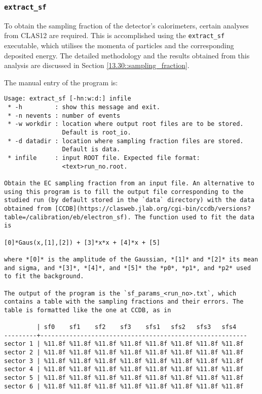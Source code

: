 \subsubsection{\texttt{extract\_sf}}
\label{13.12::extract_sf}
    To obtain the sampling fraction of the detector's calorimeters, certain analyses from CLAS12 are required.
    This is accomplished using the \texttt{extract\_sf} executable, which utilises the momenta of particles and the corresponding deposited energy.
    The detailed methodology and the results obtained from this analysis are discussed in Section \ref{13.30::sampling_fraction}.

    The manual entry of the program is:
    \begin{lstlisting}
Usage: extract_sf [-hn:w:d:] infile
 * -h         : show this message and exit.
 * -n nevents : number of events
 * -w workdir : location where output root files are to be stored.
                Default is root_io.
 * -d datadir : location where sampling fraction files are stored.
                Default is data.
 * infile     : input ROOT file. Expected file format:
                <text>run_no.root.

Obtain the EC sampling fraction from an input file. An alternative to using this program is to fill the output file corresponding to the studied run (by default stored in the `data` directory) with the data obtained from [CCDB](https://clasweb.jlab.org/cgi-bin/ccdb/versions?table=/calibration/eb/electron_sf). The function used to fit the data is

[0]*Gaus(x,[1],[2]) + [3]*x*x + [4]*x + [5]

where *[0]* is the amplitude of the Gaussian, *[1]* and *[2]* its mean and sigma, and *[3]*, *[4]*, and *[5]* the *p0*, *p1*, and *p2* used to fit the background.

The output of the program is the `sf_params_<run_no>.txt`, which contains a table with the sampling fractions and their errors. The table is formatted like the one at CCDB, as in

         | sf0    sf1    sf2    sf3    sfs1   sfs2   sfs3   sfs4
---------+---------------------------------------------------------
sector 1 | %11.8f %11.8f %11.8f %11.8f %11.8f %11.8f %11.8f %11.8f
sector 2 | %11.8f %11.8f %11.8f %11.8f %11.8f %11.8f %11.8f %11.8f
sector 3 | %11.8f %11.8f %11.8f %11.8f %11.8f %11.8f %11.8f %11.8f
sector 4 | %11.8f %11.8f %11.8f %11.8f %11.8f %11.8f %11.8f %11.8f
sector 5 | %11.8f %11.8f %11.8f %11.8f %11.8f %11.8f %11.8f %11.8f
sector 6 | %11.8f %11.8f %11.8f %11.8f %11.8f %11.8f %11.8f %11.8f
    \end{lstlisting}
